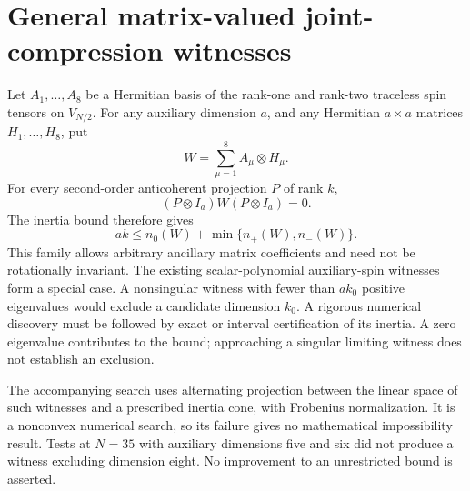 \documentclass{article}
\begin{document}
\section*{General matrix-valued joint-compression witnesses}
Let $A_1,\ldots,A_8$ be a Hermitian basis of the rank-one and rank-two
traceless spin tensors on $V_{N/2}$. For any auxiliary dimension $a$,
and any Hermitian $a\times a$ matrices $H_1,\ldots,H_8$, put
\[
 W=\sum_{\mu=1}^8 A_\mu\otimes H_\mu.
\]
For every second-order anticoherent projection $P$ of rank $k$,
\[
 (P\otimes I_a)W(P\otimes I_a)=0.
\]
The inertia bound therefore gives
\[
 ak\le n_0(W)+\min\{n_+(W),n_-(W)\}.
\]
This family allows arbitrary ancillary matrix coefficients and need not
be rotationally invariant. The existing scalar-polynomial auxiliary-spin
witnesses form a special case. A nonsingular witness with fewer than
$ak_0$ positive eigenvalues would exclude a candidate dimension $k_0$.
A rigorous numerical discovery must be followed by exact or interval
certification of its inertia. A zero eigenvalue contributes to the bound;
approaching a singular limiting witness does not establish an exclusion.

The accompanying search uses alternating projection between the linear
space of such witnesses and a prescribed inertia cone, with Frobenius
normalization. It is a nonconvex numerical search, so its failure gives
no mathematical impossibility result. Tests at $N=35$ with auxiliary
dimensions five and six did not produce a witness excluding dimension
eight. No improvement to an unrestricted bound is asserted.
\end{document}
